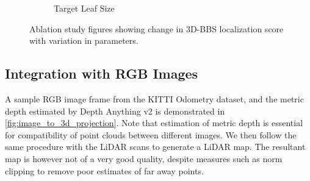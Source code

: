 \begin{figure}[t]
\begin{subfigure}[t]{0.32\textwidth}
        \caption{Target Leaf Size}
    \end{subfigure}
    \caption{Ablation study figures showing change in 3D-BBS localization score with variation in parameters.}
    \label{fig:ablation_study}
\end{figure}

\subsection{Integration with RGB Images}

A sample RGB image frame from the KITTI Odometry dataset, and the metric depth estimated by Depth Anything v2 is demonstrated in \autoref{fig:image_to_3d_projection}. Note that estimation of metric depth is essential for compatibility of point clouds between different images. We then follow the same procedure with the LiDAR scans to generate a LiDAR map. The resultant map is however not of a very good quality, despite measures such as norm clipping to remove poor estimates of far away points.

